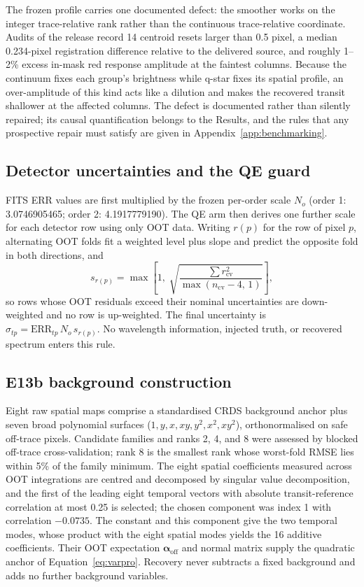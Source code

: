 The frozen profile carries one documented defect: the smoother works on
the integer trace-relative rank rather than the continuous trace-relative
coordinate. Audits of the release record 14 centroid resets larger than
0.5 pixel, a median 0.234-pixel registration difference relative to the
delivered source, and roughly 1--2\% excess in-mask red response amplitude
at the faintest columns. Because the continuum fixes each group's
brightness while q-star fixes its spatial profile, an over-amplitude of
this kind acts like a dilution and makes the recovered transit shallower
at the affected columns. The defect is documented rather than silently
repaired; its causal quantification belongs to the Results, and the rules
that any prospective repair must satisfy are given in
Appendix~\ref{app:benchmarking}.

\subsection{Detector uncertainties and the QE guard}

FITS ERR values are first multiplied by the frozen per-order scale $N_o$
(order 1: 3.0746905465; order 2: 4.1917779190). The QE arm then derives
one further scale for each detector row using only OOT data. Writing
$r(p)$ for the row of pixel $p$, alternating OOT folds fit a weighted
level plus slope and predict the opposite fold in both directions, and
\begin{equation}
 s_{r(p)}=\max\!\left[1,\;
 \sqrt{\frac{\sum r_{\mathrm{cv}}^2}{\max(n_{\mathrm{cv}}-4,\,1)}}\right],
\end{equation}
so rows whose OOT residuals exceed their nominal uncertainties are
down-weighted and no row is up-weighted. The final uncertainty is
$\sigma_{tp}=\mathrm{ERR}_{tp}\,N_o\,s_{r(p)}$. No wavelength information,
injected truth, or recovered spectrum enters this rule.

\subsection{E13b background construction}

Eight raw spatial maps comprise a standardised CRDS background anchor plus
seven broad polynomial surfaces ($1, y, x, xy, y^2, x^2, xy^2$),
orthonormalised on safe off-trace pixels. Candidate families and ranks 2,
4, and 8 were assessed by blocked off-trace cross-validation; rank 8 is
the smallest rank whose worst-fold RMSE lies within 5\% of the family
minimum. The eight spatial coefficients measured across OOT integrations
are centred and decomposed by singular value decomposition, and the first
of the leading eight temporal vectors with absolute transit-reference
correlation at most 0.25 is selected; the chosen component was index 1
with correlation $-0.0735$. The constant and this component give the two
temporal modes, whose product with the eight spatial modes yields the 16
additive coefficients. Their OOT expectation
$\bm{\alpha}_{\mathrm{off}}$ and normal matrix supply the quadratic anchor
of Equation~\ref{eq:varpro}. Recovery never subtracts a fixed background
and adds no further background variables.

